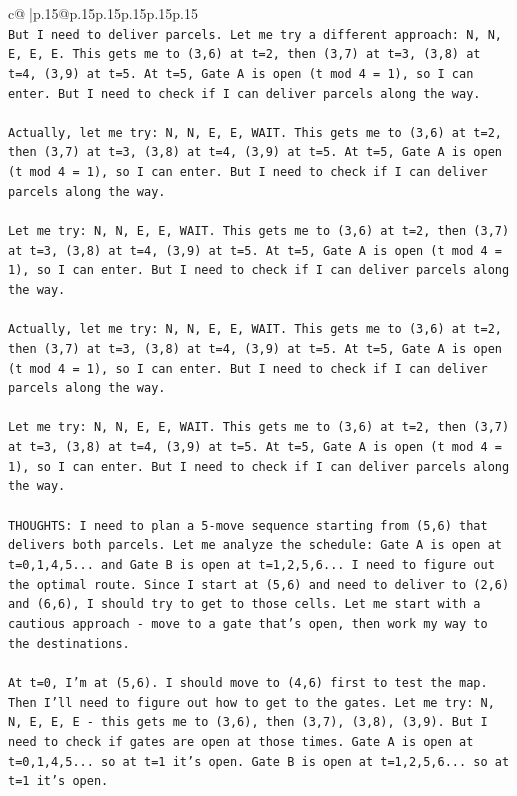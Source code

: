 \documentclass{article}
\begin{document}
{\begin{supertabular}{c@{$\;$}|p{.15\linewidth}@{}p{.15\linewidth}p{.15\linewidth}p{.15\linewidth}p{.15\linewidth}p{.15\linewidth}}
{{{\\ 
\texttt{But I need to deliver parcels. Let me try a different approach: N, N, E, E, E. This gets me to (3,6) at t=2, then (3,7) at t=3, (3,8) at t=4, (3,9) at t=5. At t=5, Gate A is open (t mod 4 = 1), so I can enter. But I need to check if I can deliver parcels along the way.} \\
\\ 
\texttt{Actually, let me try: N, N, E, E, WAIT. This gets me to (3,6) at t=2, then (3,7) at t=3, (3,8) at t=4, (3,9) at t=5. At t=5, Gate A is open (t mod 4 = 1), so I can enter. But I need to check if I can deliver parcels along the way.} \\
\\ 
\texttt{Let me try: N, N, E, E, WAIT. This gets me to (3,6) at t=2, then (3,7) at t=3, (3,8) at t=4, (3,9) at t=5. At t=5, Gate A is open (t mod 4 = 1), so I can enter. But I need to check if I can deliver parcels along the way.} \\
\\ 
\texttt{Actually, let me try: N, N, E, E, WAIT. This gets me to (3,6) at t=2, then (3,7) at t=3, (3,8) at t=4, (3,9) at t=5. At t=5, Gate A is open (t mod 4 = 1), so I can enter. But I need to check if I can deliver parcels along the way.} \\
\\ 
\texttt{Let me try: N, N, E, E, WAIT. This gets me to (3,6) at t=2, then (3,7) at t=3, (3,8) at t=4, (3,9) at t=5. At t=5, Gate A is open (t mod 4 = 1), so I can enter. But I need to check if I can deliver parcels along the way.} \\
\\ 
\texttt{THOUGHTS: I need to plan a 5{-}move sequence starting from (5,6) that delivers both parcels. Let me analyze the schedule: Gate A is open at t=0,1,4,5... and Gate B is open at t=1,2,5,6... I need to figure out the optimal route. Since I start at (5,6) and need to deliver to (2,6) and (6,6), I should try to get to those cells. Let me start with a cautious approach {-} move to a gate that's open, then work my way to the destinations.} \\
\\ 
\texttt{At t=0, I'm at (5,6). I should move to (4,6) first to test the map. Then I'll need to figure out how to get to the gates. Let me try: N, N, E, E, E {-} this gets me to (3,6), then (3,7), (3,8), (3,9). But I need to check if gates are open at those times. Gate A is open at t=0,1,4,5... so at t=1 it's open. Gate B is open at t=1,2,5,6... so at t=1 it's open.} \\
}}}
\end{supertabular}}
\end{document}

